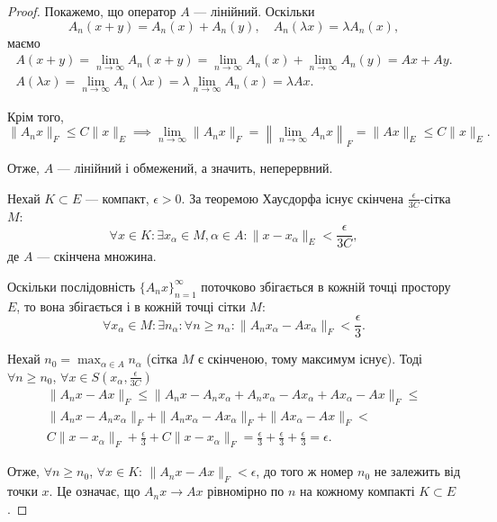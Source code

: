 \begin{proof}
Покажемо, що оператор $A$ --- лінійний. Оскільки
\begin{equation*}
    A_n(x + y) = A_n(x) + A_n(y), \quad A_n(\lambda x) = \lambda A_n(x),
\end{equation*}
маємо
\begin{gather*}
    A(x + y) =
    \lim_{n \to \infty} A_n(x + y) =
    \lim_{n \to \infty} A_n(x) + \lim_{n \to \infty} A_n(y) =
    A x + A y. \\
    A(\lambda x) =
    \lim_{n \to \infty} A_n(\lambda x) =
    \lambda \lim_{n \to \infty} A_n(x) =
    \lambda A x.
\end{gather*}

Крім того,
\begin{equation*}
    \|A_n x\|_F \le C \|x\|_E \implies
    \lim_{n \to \infty} \|A_n x\|_F =
    \left\| \lim_{n \to \infty} A_n x \right\|_F =
    \|A x\|_E \le C \|x\|_E.
\end{equation*}

Отже, $A$ --- лінійний і обмежений, а значить, неперервний.

Нехай $K \subset E$ --- компакт, $\epsilon > 0$. За теоремою Хаусдорфа
існує скінчена $\frac{\epsilon}{3 C}$-сітка $M$:
\begin{equation*}
    \forall x \in K:
    \exists x_\alpha \in M, \alpha \in A:
    \|x - x_\alpha\|_E < \frac{\epsilon}{3 C},
\end{equation*}
де $A$ --- скінчена множина.

Оскільки послідовність $\{A_n x\}_{n = 1}^\infty$
поточково збігається в
кожній точці простору $E$, то вона збігається і в кожній точці
сітки $M$:
\begin{equation*}
    \forall x_\alpha \in M:
    \exists n_\alpha:
    \forall n \ge n_\alpha:
    \|A_n x_\alpha - A x_\alpha\|_F < \frac{\epsilon}{3}.
\end{equation*}

Нехай $n_0 = \max_{\alpha \in A} n_\alpha$ (сітка $M$ є скінченою, тому максимум існує).
Тоді $\forall n \ge n_0$, $\forall x \in S\left(x_\alpha, \frac{\epsilon}{3C}\right)$
\begin{multline*}
    \|A_n x - A x\|_F \le
    \|A_n x - A_n x_\alpha + A_n x_\alpha - A x_\alpha + A x_\alpha - A x\|_F \le \\
    \|A_n x - A_n x_\alpha\|_F + \|A_n x_\alpha - A x_\alpha\|_F + \|A x_\alpha - A x\|_F < \\
    C \|x - x_\alpha\|_F + \frac{\epsilon}{3} + C \|x - x_\alpha\|_F =
    \frac{\epsilon}{3} + \frac{\epsilon}{3} + \frac{\epsilon}{3} = \epsilon.
\end{multline*}

Отже, $\forall n \ge n_0$, $\forall x \in K$: $\|A_n x - A x\|_F < \epsilon$,
до того ж номер $n_0$ не залежить від точки $x$. Це означає, що
$A_n x \to A x$ рівномірно по $n$ на кожному компакті $K \subset E$.
\end{proof}


